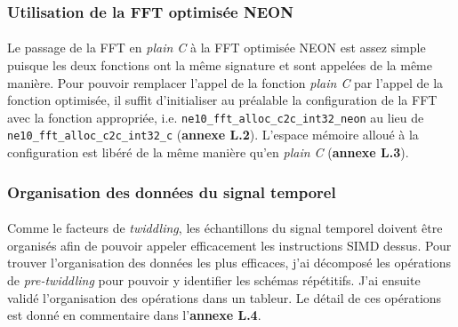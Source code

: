 \documentclass{article}
\begin{document}
    \subsubsection{Utilisation de la FFT optimisée NEON}
    \paragraph{}
    Le passage de la FFT en \emph{plain C} à la FFT optimisée NEON est assez simple puisque les deux fonctions ont la même signature et sont appelées de la même manière. Pour pouvoir remplacer l'appel de la fonction \emph{plain C} par l'appel de la fonction optimisée, il suffit d'initialiser au préalable la configuration de la FFT avec la fonction appropriée, i.e. \texttt{ne10\_fft\_alloc\_c2c\_int32\_neon} au lieu de \texttt{ne10\_fft\_alloc\_c2c\_int32\_c} (\textbf{annexe L.2}). L'espace mémoire alloué à la configuration est libéré de la même manière qu'en \emph{plain C} (\textbf{annexe L.3}).

    \subsubsection{Organisation des données du signal temporel}
    \paragraph{}
    Comme le facteurs de \emph{twiddling}, les échantillons du signal temporel doivent être organisés afin de pouvoir appeler efficacement les instructions SIMD dessus. Pour trouver l'organisation des données les plus efficaces, j'ai décomposé les opérations de \emph{pre-twiddling} pour pouvoir y identifier les schémas répétitifs. J'ai ensuite validé l'organisation des opérations dans un tableur. Le détail de ces opérations est donné en commentaire dans l'\textbf{annexe L.4}.
\end{document}
